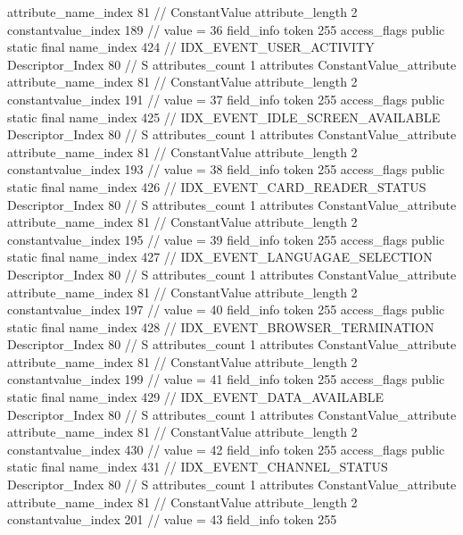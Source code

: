 {{{{{{{					attribute_name_index	81		// ConstantValue
					attribute_length	2
					constantvalue_index	189		// value = 36
				}
				}
			}
			field_info {
				token	255
				access_flags	public static final
				name_index	424		// IDX_EVENT_USER_ACTIVITY
				Descriptor_Index	80		// S
				attributes_count	1
				attributes {
				ConstantValue_attribute {
					attribute_name_index	81		// ConstantValue
					attribute_length	2
					constantvalue_index	191		// value = 37
				}
				}
			}
			field_info {
				token	255
				access_flags	public static final
				name_index	425		// IDX_EVENT_IDLE_SCREEN_AVAILABLE
				Descriptor_Index	80		// S
				attributes_count	1
				attributes {
				ConstantValue_attribute {
					attribute_name_index	81		// ConstantValue
					attribute_length	2
					constantvalue_index	193		// value = 38
				}
				}
			}
			field_info {
				token	255
				access_flags	public static final
				name_index	426		// IDX_EVENT_CARD_READER_STATUS
				Descriptor_Index	80		// S
				attributes_count	1
				attributes {
				ConstantValue_attribute {
					attribute_name_index	81		// ConstantValue
					attribute_length	2
					constantvalue_index	195		// value = 39
				}
				}
			}
			field_info {
				token	255
				access_flags	public static final
				name_index	427		// IDX_EVENT_LANGUAGAE_SELECTION
				Descriptor_Index	80		// S
				attributes_count	1
				attributes {
				ConstantValue_attribute {
					attribute_name_index	81		// ConstantValue
					attribute_length	2
					constantvalue_index	197		// value = 40
				}
				}
			}
			field_info {
				token	255
				access_flags	public static final
				name_index	428		// IDX_EVENT_BROWSER_TERMINATION
				Descriptor_Index	80		// S
				attributes_count	1
				attributes {
				ConstantValue_attribute {
					attribute_name_index	81		// ConstantValue
					attribute_length	2
					constantvalue_index	199		// value = 41
				}
				}
			}
			field_info {
				token	255
				access_flags	public static final
				name_index	429		// IDX_EVENT_DATA_AVAILABLE
				Descriptor_Index	80		// S
				attributes_count	1
				attributes {
				ConstantValue_attribute {
					attribute_name_index	81		// ConstantValue
					attribute_length	2
					constantvalue_index	430		// value = 42
				}
				}
			}
			field_info {
				token	255
				access_flags	public static final
				name_index	431		// IDX_EVENT_CHANNEL_STATUS
				Descriptor_Index	80		// S
				attributes_count	1
				attributes {
				ConstantValue_attribute {
					attribute_name_index	81		// ConstantValue
					attribute_length	2
					constantvalue_index	201		// value = 43
				}
				}
			}
			field_info {
				token	255
}}}}}

